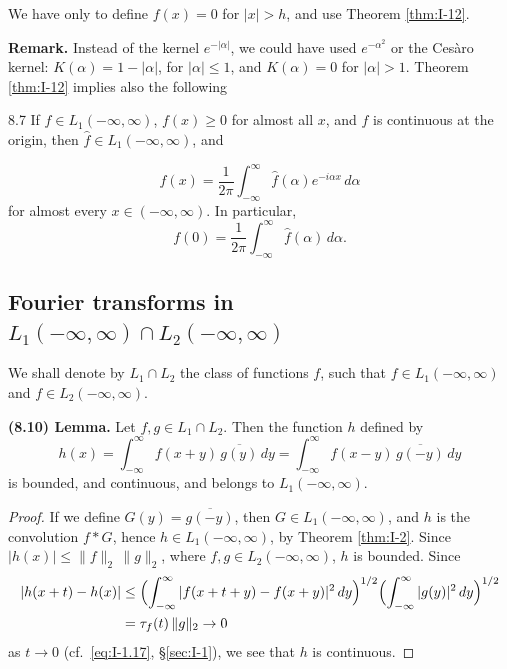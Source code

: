 We have only to define $f(x)=0$ for $|x|>h$, and use Theorem \ref{thm:I-12}.

\noindent\textbf{Remark.}
Instead of the kernel $e^{-|\alpha|}$, we could have used $e^{-\alpha^{2}}$ or the Ces\`aro kernel: $K(\alpha)=1-|\alpha|$, for $|\alpha|\le 1$, and $K(\alpha)=0$ for $|\alpha|>1$. Theorem \ref{thm:I-12} implies also the following

\begin{nstmt}{8.7}\label{eq:I-8.7}
If $f\in L_1(-\infty,\infty)$, $f(x)\ge 0$ for almost all $x$, and $f$ is continuous at the origin, then $\widehat f\in L_1(-\infty,\infty)$, and
\end{nstmt}
\begin{equation}\label{eq:I-8.8}\tag{8.8}
f(x)=\frac{1}{2\pi}\int_{-\infty}^{\infty}\widehat f(\alpha)e^{-i\alpha x}\,d\alpha
\end{equation}
for almost every $x\in(-\infty,\infty)$. In particular,
\begin{equation}\label{eq:I-8.9}\tag{8.9}
f(0)=\frac{1}{2\pi}\int_{-\infty}^{\infty}\widehat f(\alpha)\,d\alpha.
\end{equation}

\subsection*{Fourier transforms in $L_1(-\infty,\infty)\cap L_2(-\infty,\infty)$}
We shall denote by $L_1\cap L_2$ the class of functions $f$, such that $f\in L_1(-\infty,\infty)$ and $f\in L_2(-\infty,\infty)$.

\noindent\textbf{(8.10) Lemma.}
Let $f,g\in L_1\cap L_2$. Then the function $h$ defined by
\begin{equation}\label{eq:I-8.11}\tag{8.11}
h(x)=\int_{-\infty}^{\infty}f(x+y)\,\overline{g(y)}\,dy
=\int_{-\infty}^{\infty}f(x-y)\,\overline{g(-y)}\,dy
\end{equation}
is bounded, and continuous, and belongs to $L_1(-\infty,\infty)$.

\begin{proof}
If we define $G(y)=\overline{g(-y)}$, then $G\in L_1(-\infty,\infty)$, and $h$ is the convolution $f*G$, hence $h\in L_1(-\infty,\infty)$, by Theorem \ref{thm:I-2}. Since $|h(x)|\le\|f\|_2\,\|g\|_2$, where $f,g\in L_2(-\infty,\infty)$, $h$ is bounded. Since
\begin{equation*}
\begin{aligned}
|h(x+t)-h(x)| &\le \Bigl(\int_{-\infty}^{\infty}|f(x+t+y)-f(x+y)|^{2}\,dy\Bigr)^{1/2}\Bigl(\int_{-\infty}^{\infty}|g(y)|^{2}\,dy\Bigr)^{1/2}\\
&= \tau_f(t)\,\|g\|_2\to 0
\end{aligned}
\end{equation*}
as $t\to 0$ (cf.\ \eqref{eq:I-1.17}, \S\ref{sec:I-1}), we see that $h$ is continuous.
\end{proof}

